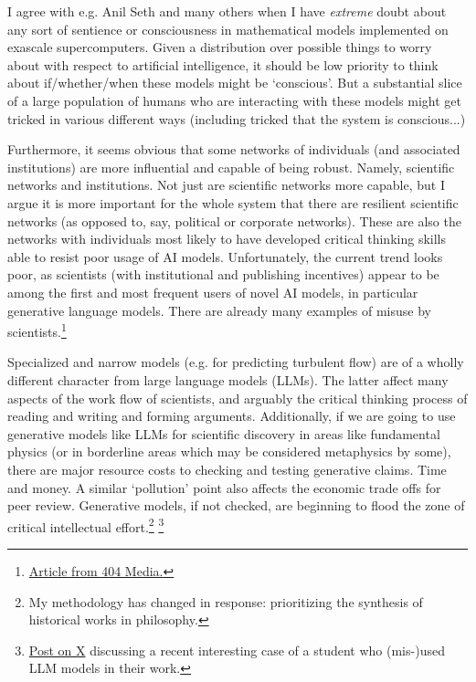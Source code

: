 \documentclass[11pt, oneside]{article}   	%
\begin{document}
I agree with e.g. Anil Seth and many others when I have \emph{extreme} doubt about any sort of sentience or consciousness in mathematical models implemented on exascale supercomputers.  Given a distribution over possible things to worry about with respect to artificial intelligence, it should be low priority to think about if/whether/when these models might be `conscious'.  But a substantial slice of a large population of humans who are interacting with these models might get tricked in various different ways (including tricked that the system is conscious...)

Furthermore, it seems obvious that some networks of individuals (and associated institutions) are more influential and capable of being robust.  Namely, scientific networks and institutions.  Not just are scientific networks more capable, but I argue it is more important for the whole system that there are resilient scientific networks (as opposed to, say, political or corporate networks).  These are also the networks with individuals most likely to have developed critical thinking skills able to resist poor usage of AI models.  Unfortunately, the current trend looks poor, as scientists (with institutional and publishing incentives) appear to be among the first and most frequent users of novel AI models, in particular generative language models.  There are already many examples of misuse by scientists.\footnote{\href{https://www.404media.co/scientific-journals-are-publishing-papers-with-ai-generated-text/}{Article from 404 Media.}}

Specialized and narrow models (e.g. for predicting turbulent flow) are of a wholly different character from large language models (LLMs).  The latter affect many aspects of the work flow of scientists, and arguably the critical thinking process of reading and writing and forming arguments.  Additionally, if we are going to use generative models like LLMs for scientific discovery in areas like fundamental physics (or in borderline areas which may be considered metaphysics by some), there are major resource costs to checking and testing generative claims.  Time and money.  A similar `pollution' point also affects the economic trade offs for peer review.  Generative models, if not checked, are beginning to flood the zone of critical intellectual effort.\footnote{My methodology has changed in response: prioritizing the synthesis of historical works in philosophy.} \footnote{\href{https://twitter.com/BeebsMemes/status/1759282741680443600}{Post on X} discussing a recent interesting case of a student who (mis-)used LLM models in their work.}
\end{document}
